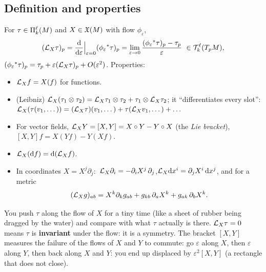 \subsection{Definition and properties}
\begin{formal}
For $\tau\in\Pi^{\ell}_{k}(M)$ and $X\in\mathfrak{X}(M)$ with flow $\phi_\varepsilon$,
\[
(\Lie_X\tau)_p=\frac{\dd}{\dd\varepsilon}\Big|_{\varepsilon=0}(\phi_\varepsilon\pb\tau)_p=\lim_{\varepsilon\to0}\frac{(\phi_\varepsilon\pb\tau)_p-\tau_p}{\varepsilon}\ \in\TT{\ell}{k}(T_pM),
\]
\ie $(\phi_\varepsilon{}^{*}\tau)_p=\tau_p+\varepsilon(\mathcal{L}_X\tau)_p+O(\varepsilon^2)$. Properties:
\begin{itemize}[nosep]
\item $\mathcal{L}_Xf=X(f)$ for functions.
\item (Leibniz) $\mathcal{L}_X(\tau_1\otimes\tau_2)=\mathcal{L}_X\tau_1\otimes\tau_2+\tau_1\otimes\mathcal{L}_X\tau_2$; it ``differentiates every slot'': $\mathcal{L}_X(\tau(v_1,\dots))=(\mathcal{L}_X\tau)(v_1,\dots)+\tau(\mathcal{L}_Xv_1,\dots)+\dots$
\item For vector fields, $\mathcal{L}_XY=[X,Y]=X\circ Y-Y\circ X$ (the \emph{Lie bracket}), \ie $[X,Y]f=X(Yf)-Y(Xf)$.
\item $\mathcal{L}_X(\mathrm{d} f)=\mathrm{d}(\mathcal{L}_Xf)$.
\item In coordinates $X=X^j\partial_j$:\ $\mathcal{L}_X\partial_i=-\partial_iX^j\,\partial_j$,\quad $\mathcal{L}_X\mathrm{d} x^i=\partial_jX^i\,\mathrm{d} x^j$, and for a metric
\begin{equation}\label{eq:liemetric}
(\mathcal{L}_Xg)_{ab}=X^k\partial_kg_{ab}+g_{kb}\,\partial_aX^k+g_{ak}\,\partial_bX^k .
\end{equation}
\end{itemize}
\end{formal}

\begin{intuition}
You push $\tau$ along the flow of $X$ for a tiny time (like a sheet of rubber being dragged by the water) and compare with what $\tau$ actually is there. $\mathcal{L}_X\tau=0$ means $\tau$ is \textbf{invariant} under the flow: it is a symmetry. The bracket $[X,Y]$ measures the failure of the flows of $X$ and $Y$ to commute: go $\varepsilon$ along $X$, then $\varepsilon$ along $Y$, then back along $X$ and $Y$: you end up displaced by $\varepsilon^2[X,Y]$ (a rectangle that does not close).
\end{intuition}

